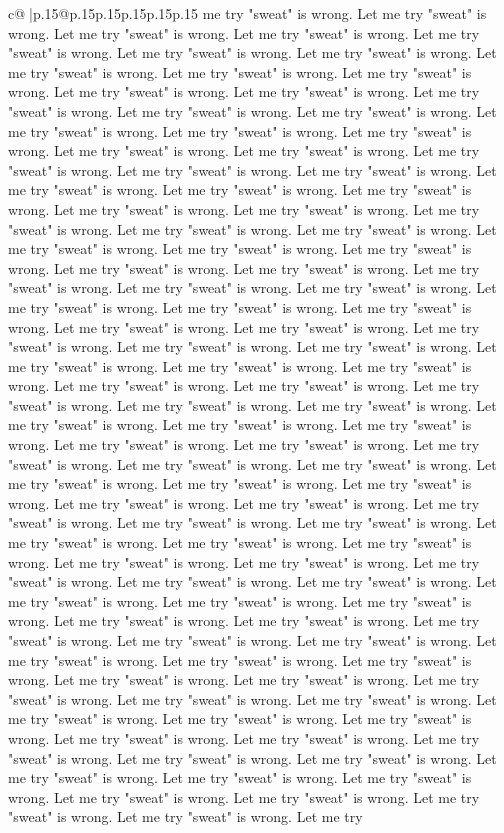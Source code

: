 \documentclass{article}
\begin{document}
{\begin{supertabular}{c@{$\;$}|p{.15\linewidth}@{}p{.15\linewidth}p{.15\linewidth}p{.15\linewidth}p{.15\linewidth}p{.15\linewidth}}
{{{me try "sweat" is wrong. Let me try "sweat" is wrong. Let me try "sweat" is wrong. Let me try "sweat" is wrong. Let me try "sweat" is wrong. Let me try "sweat" is wrong. Let me try "sweat" is wrong. Let me try "sweat" is wrong. Let me try "sweat" is wrong. Let me try "sweat" is wrong. Let me try "sweat" is wrong. Let me try "sweat" is wrong. Let me try "sweat" is wrong. Let me try "sweat" is wrong. Let me try "sweat" is wrong. Let me try "sweat" is wrong. Let me try "sweat" is wrong. Let me try "sweat" is wrong. Let me try "sweat" is wrong. Let me try "sweat" is wrong. Let me try "sweat" is wrong. Let me try "sweat" is wrong. Let me try "sweat" is wrong. Let me try "sweat" is wrong. Let me try "sweat" is wrong. Let me try "sweat" is wrong. Let me try "sweat" is wrong. Let me try "sweat" is wrong. Let me try "sweat" is wrong. Let me try "sweat" is wrong. Let me try "sweat" is wrong. Let me try "sweat" is wrong. Let me try "sweat" is wrong. Let me try "sweat" is wrong. Let me try "sweat" is wrong. Let me try "sweat" is wrong. Let me try "sweat" is wrong. Let me try "sweat" is wrong. Let me try "sweat" is wrong. Let me try "sweat" is wrong. Let me try "sweat" is wrong. Let me try "sweat" is wrong. Let me try "sweat" is wrong. Let me try "sweat" is wrong. Let me try "sweat" is wrong. Let me try "sweat" is wrong. Let me try "sweat" is wrong. Let me try "sweat" is wrong. Let me try "sweat" is wrong. Let me try "sweat" is wrong. Let me try "sweat" is wrong. Let me try "sweat" is wrong. Let me try "sweat" is wrong. Let me try "sweat" is wrong. Let me try "sweat" is wrong. Let me try "sweat" is wrong. Let me try "sweat" is wrong. Let me try "sweat" is wrong. Let me try "sweat" is wrong. Let me try "sweat" is wrong. Let me try "sweat" is wrong. Let me try "sweat" is wrong. Let me try "sweat" is wrong. Let me try "sweat" is wrong. Let me try "sweat" is wrong. Let me try "sweat" is wrong. Let me try "sweat" is wrong. Let me try "sweat" is wrong. Let me try "sweat" is wrong. Let me try "sweat" is wrong. Let me try "sweat" is wrong. Let me try "sweat" is wrong. Let me try "sweat" is wrong. Let me try "sweat" is wrong. Let me try "sweat" is wrong. Let me try "sweat" is wrong. Let me try "sweat" is wrong. Let me try "sweat" is wrong. Let me try "sweat" is wrong. Let me try "sweat" is wrong. Let me try "sweat" is wrong. Let me try "sweat" is wrong. Let me try "sweat" is wrong. Let me try "sweat" is wrong. Let me try "sweat" is wrong. Let me try "sweat" is wrong. Let me try "sweat" is wrong. Let me try "sweat" is wrong. Let me try "sweat" is wrong. Let me try "sweat" is wrong. Let me try "sweat" is wrong. Let me try "sweat" is wrong. Let me try "sweat" is wrong. Let me try "sweat" is wrong. Let me try "sweat" is wrong. Let me try "sweat" is wrong. Let me try "sweat" is wrong. Let me try "sweat" is wrong. Let me try "sweat" is wrong. Let me try "sweat" is wrong. Let me try "sweat" is wrong. Let me try "sweat" is wrong. Let me try "sweat" is wrong. Let me try "sweat" is wrong. Let me try "sweat" is wrong. Let me try "sweat" is wrong. Let me try "sweat" is wrong. Let me try "sweat" is wrong. Let me try "sweat" is wrong. Let me try "sweat" is wrong. Let me try }}}
\end{supertabular}}
\end{document}
